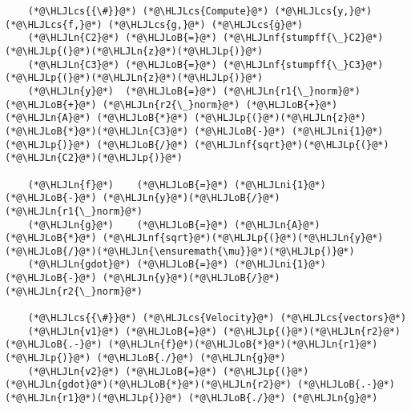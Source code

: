 \documentclass[12pt,a4paper]{article}
\newcommand{\HLJLn}[1]{#1}
\newcommand{\HLJLnf}[1]{\textcolor[RGB]{66,102,213}{#1}}
\newcommand{\HLJLni}[1]{\textcolor[RGB]{59,151,46}{#1}}
\newcommand{\HLJLoB}[1]{\textcolor[RGB]{102,102,102}{\textbf{#1}}}
\newcommand{\HLJLp}[1]{#1}
\newcommand{\HLJLcs}[1]{\textcolor[RGB]{153,153,119}{\textit{#1}}}
\begin{document}
\begin{lstlisting}
	(*@\HLJLcs{{\#}}@*) (*@\HLJLcs{Compute}@*) (*@\HLJLcs{y,}@*) (*@\HLJLcs{f,}@*) (*@\HLJLcs{g,}@*) (*@\HLJLcs{ġ}@*)
	(*@\HLJLn{C2}@*) (*@\HLJLoB{=}@*) (*@\HLJLnf{stumpff{\_}C2}@*)(*@\HLJLp{(}@*)(*@\HLJLn{z}@*)(*@\HLJLp{)}@*)
	(*@\HLJLn{C3}@*) (*@\HLJLoB{=}@*) (*@\HLJLnf{stumpff{\_}C3}@*)(*@\HLJLp{(}@*)(*@\HLJLn{z}@*)(*@\HLJLp{)}@*)
	(*@\HLJLn{y}@*)  (*@\HLJLoB{=}@*) (*@\HLJLn{r1{\_}norm}@*) (*@\HLJLoB{+}@*) (*@\HLJLn{r2{\_}norm}@*) (*@\HLJLoB{+}@*) (*@\HLJLn{A}@*) (*@\HLJLoB{*}@*) (*@\HLJLp{(}@*)(*@\HLJLn{z}@*)(*@\HLJLoB{*}@*)(*@\HLJLn{C3}@*) (*@\HLJLoB{-}@*) (*@\HLJLni{1}@*)(*@\HLJLp{)}@*) (*@\HLJLoB{/}@*) (*@\HLJLnf{sqrt}@*)(*@\HLJLp{(}@*)(*@\HLJLn{C2}@*)(*@\HLJLp{)}@*)

	(*@\HLJLn{f}@*)    (*@\HLJLoB{=}@*) (*@\HLJLni{1}@*) (*@\HLJLoB{-}@*) (*@\HLJLn{y}@*)(*@\HLJLoB{/}@*)(*@\HLJLn{r1{\_}norm}@*)
	(*@\HLJLn{g}@*)    (*@\HLJLoB{=}@*) (*@\HLJLn{A}@*) (*@\HLJLoB{*}@*) (*@\HLJLnf{sqrt}@*)(*@\HLJLp{(}@*)(*@\HLJLn{y}@*)(*@\HLJLoB{/}@*)(*@\HLJLn{\ensuremath{\mu}}@*)(*@\HLJLp{)}@*)
	(*@\HLJLn{gdot}@*) (*@\HLJLoB{=}@*) (*@\HLJLni{1}@*) (*@\HLJLoB{-}@*) (*@\HLJLn{y}@*)(*@\HLJLoB{/}@*)(*@\HLJLn{r2{\_}norm}@*)

	(*@\HLJLcs{{\#}}@*) (*@\HLJLcs{Velocity}@*) (*@\HLJLcs{vectors}@*)
	(*@\HLJLn{v1}@*) (*@\HLJLoB{=}@*) (*@\HLJLp{(}@*)(*@\HLJLn{r2}@*) (*@\HLJLoB{.-}@*) (*@\HLJLn{f}@*)(*@\HLJLoB{*}@*)(*@\HLJLn{r1}@*)(*@\HLJLp{)}@*) (*@\HLJLoB{./}@*) (*@\HLJLn{g}@*)
	(*@\HLJLn{v2}@*) (*@\HLJLoB{=}@*) (*@\HLJLp{(}@*)(*@\HLJLn{gdot}@*)(*@\HLJLoB{*}@*)(*@\HLJLn{r2}@*) (*@\HLJLoB{.-}@*) (*@\HLJLn{r1}@*)(*@\HLJLp{)}@*) (*@\HLJLoB{./}@*) (*@\HLJLn{g}@*)


\end{lstlisting}
\end{document}
